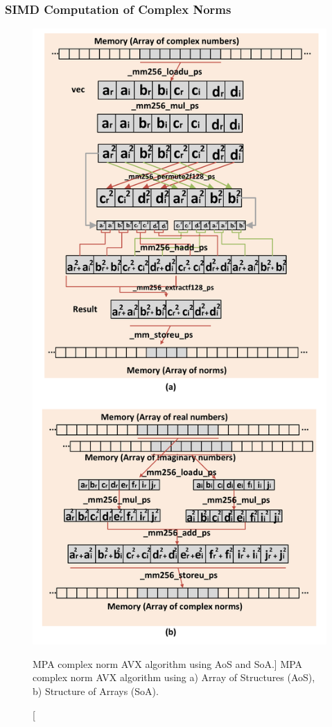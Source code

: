 \subsubsection{SIMD Computation of Complex Norms}

\begin{figure}[htp]
  \centering
  \includegraphics[width=0.70\linewidth]{scma/simd_norm/simd_norm}
  \caption
    [MPA complex norm AVX algorithm using AoS and SoA.]
    {MPA complex norm AVX algorithm using
     a) Array of Structures (AoS),
     b) Structure of Arrays (SoA).}
  \label{fig:scma_simd_norm}
\end{figure}

